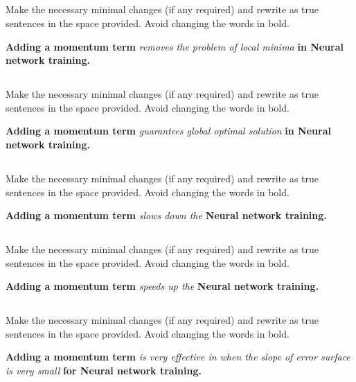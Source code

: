 \begin{frame}
\section{}
Make the necessary minimal changes  (if any required) and rewrite as true sentences in the space provided. Avoid changing the words in bold.

{\bf Adding a momentum term} {\em removes the problem of local minima} {\bf in Neural network training.}


\end{frame}


\begin{frame}
\section{}
Make the necessary minimal changes  (if any required) and rewrite as true sentences in the space provided. Avoid changing the words in bold.

{\bf Adding a momentum term} {\em guarantees global optimal solution} {\bf in Neural network training.}



\end{frame}


\begin{frame}
\section{}
Make the necessary minimal changes  (if any required) and rewrite as true sentences in the space provided. Avoid changing the words in bold.

{\bf Adding a momentum term} {\em slows down the} {\bf Neural network training.}



\end{frame}


\begin{frame}
\section{}
Make the necessary minimal changes  (if any required) and rewrite as true sentences in the space provided. Avoid changing the words in bold.

{\bf Adding a momentum term} {\em speeds up the} {\bf Neural network training.}



\end{frame}


\begin{frame}
\section{}
Make the necessary minimal changes  (if any required) and rewrite as true sentences in the space provided. Avoid changing the words in bold.

{\bf Adding a momentum term} {\em is very effective in when the slope of error surface is very small} {\bf for Neural network training.}

\end{frame}

